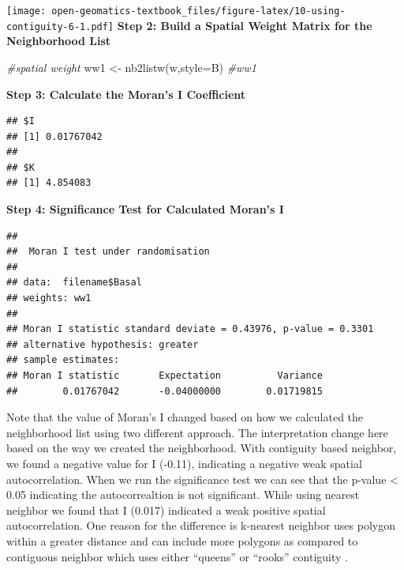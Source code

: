 \documentclass[
]{book}
\newenvironment{Shaded}{\begin{snugshade}}{\end{snugshade}}
\newcommand{\AttributeTok}[1]{\textcolor[rgb]{0.77,0.63,0.00}{#1}}
\newcommand{\CommentTok}[1]{\textcolor[rgb]{0.56,0.35,0.01}{\textit{#1}}}
\newcommand{\DocumentationTok}[1]{\textcolor[rgb]{0.56,0.35,0.01}{\textbf{\textit{#1}}}}
\newcommand{\FunctionTok}[1]{\textcolor[rgb]{0.00,0.00,0.00}{#1}}
\newcommand{\NormalTok}[1]{#1}
\newcommand{\OtherTok}[1]{\textcolor[rgb]{0.56,0.35,0.01}{#1}}
\newcommand{\SpecialCharTok}[1]{\textcolor[rgb]{0.00,0.00,0.00}{#1}}
\newcommand{\StringTok}[1]{\textcolor[rgb]{0.31,0.60,0.02}{#1}}
\begin{document}
\texttt{[image: open-geomatics-textbook\_files/figure-latex/10-using-contiguity-6-1.pdf]}
\textbf{Step 2: Build a Spatial Weight Matrix for the Neighborhood List}

\begin{Shaded}
\begin{Highlighting}[]
\CommentTok{\#spatial weight }
\NormalTok{ww1 }\OtherTok{\textless{}{-}} \FunctionTok{nb2listw}\NormalTok{(w,}\AttributeTok{style=}\StringTok{\textquotesingle{}B\textquotesingle{}}\NormalTok{)}
\CommentTok{\#ww1}
\end{Highlighting}
\end{Shaded}

\textbf{Step 3: Calculate the Moran's I Coefficient}

\begin{Shaded}
\end{Shaded}

\begin{verbatim}
## $I
## [1] 0.01767042
## 
## $K
## [1] 4.854083
\end{verbatim}

\textbf{Step 4: Significance Test for Calculated Moran's I}

\begin{Shaded}
\end{Shaded}

\begin{verbatim}
## 
##  Moran I test under randomisation
## 
## data:  filename$Basal  
## weights: ww1    
## 
## Moran I statistic standard deviate = 0.43976, p-value = 0.3301
## alternative hypothesis: greater
## sample estimates:
## Moran I statistic       Expectation          Variance 
##        0.01767042       -0.04000000        0.01719815
\end{verbatim}

Note that the value of Moran's I changed based on how we calculated the neighborhood list using two different approach. The interpretation change here based on the way we created the neighborhood. With contiguity based neighbor, we found a negative value for I (-0.11), indicating a negative weak spatial autocorrelation. When we run the significance test we can see that the p-value \textless{} 0.05 indicating the autocorrealtion is not significant. While using nearest neighbor we found that I (0.017) indicated a weak positive spatial autocorrelation. One reason for the difference is k-nearest neighbor uses polygon within a greater distance and can include more polygons as compared to contiguous neighbor which uses either ``queens'' or ``rooks'' contiguity \citep{suryowati_comparison_2018}.
\end{document}
